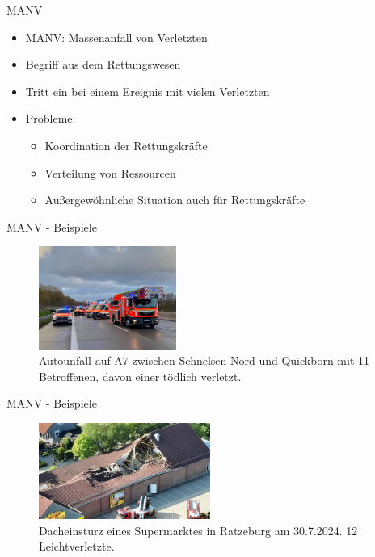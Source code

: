 \begin{frame}{MANV}
	\begin{itemize}
		\item MANV: \alert{Massenanfall von Verletzten}
		\item Begriff aus dem Rettungswesen
		\item Tritt ein bei einem Ereignis mit vielen Verletzten
		\item Probleme:
		      \begin{itemize}
			      \item Koordination der Rettungskräfte
			      \item Verteilung von Ressourcen
			      \item Außergewöhnliche Situation auch für Rettungskräfte
		      \end{itemize}
	\end{itemize}
\end{frame}

\begin{frame}{MANV - Beispiele}
	\begin{examples}
		\begin{figure}
			\begin{center}
				\includegraphics[width=0.4\textwidth]{images/autounfall.jpg}
			\end{center}
			\caption{Autounfall auf A7 zwischen Schnelsen-Nord und Quickborn mit 11 Betroffenen, davon einer tödlich verletzt.\cite{manv-a7}}\label{fig:autounfall}
		\end{figure}
	\end{examples}
\end{frame}

\begin{frame}{MANV - Beispiele}
	\begin{examples}
		\begin{figure}
			\begin{center}
				\includegraphics[width=0.5\textwidth]{images/ratzeburg-netto.jpg}
			\end{center}
			\caption{Dacheinsturz eines Supermarktes in Ratzeburg am 30.7.2024. 12 Leichtverletzte.\cite{manv-ratzeburg}}\label{fig:netto}
		\end{figure}
	\end{examples}
\end{frame}


